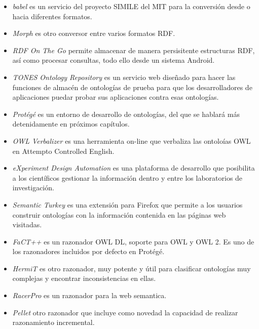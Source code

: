 \begin{itemize}
		\item \textit{babel} es un servicio del proyecto SIMILE del MIT para la conversión desde o hacia diferentes formatos.

		\item \textit{Morph} es otro conversor entre varios formatos RDF.

		\item \textit{RDF On The Go} permite almacenar de manera persisitente estructuras RDF, así como procesar consultas, todo ello desde un sistema Android.
		
		\item \textit{TONES Ontology Repository} es un servicio web diseñado para hacer las funciones de almacén de ontologías de prueba para que los desarrolladores de aplicaciones puedar probar sus aplicaciones contra esas ontologías.

		\item \textit{Protégé} es un entorno de desarrollo de ontologías, del que se hablará más detenidamente en próximos capítulos.

		\item \textit{OWL Verbalizer} es una herramienta on-line que verbaliza las ontoloías OWL en Attempto Controlled English.

		\item \textit{eXperiment Design Automation} es una plataforma de desarrollo que posibilita a los científicos gestionar la información dentro y entre los laboratorios de investigación.

		\item \textit{Semantic Turkey} es una extensión para Firefox que permite a los usuarios construir ontologías con la información contenida en las páginas web visitadas. 

		\item \textit{FaCT++} es un razonador OWL DL, soporte para OWL y OWL 2. Es uno de los razonadores incluidos por defecto en Protégé.

		\item \textit{HermiT} es otro razonador, muy potente y útil para clasificar ontologías muy complejas y encontrar inconsistencias en ellas.

		\item \textit{RacerPro} es un razonador para la web semantica.
	
		\item \textit{Pellet} otro razonador que incluye como novedad la capacidad de realizar razonamiento incremental.
    	
	\end{itemize}
    	
